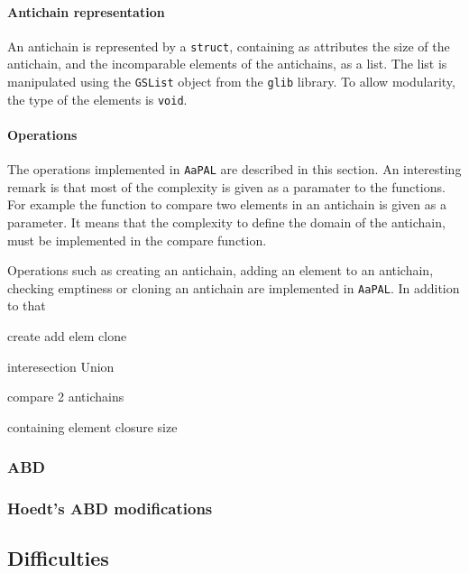 \documentclass[letterpaper]{article}
\begin{document}
\paragraph{Antichain representation}

An antichain is represented by a \texttt{struct}, containing as attributes
the size of the antichain, and the incomparable elements of the antichains,
as a list. The list is manipulated using the \texttt{GSList} object
from the \texttt{glib} library. To allow modularity, the type of the elements
is \texttt{void}.

\paragraph{Operations}

The operations implemented in \texttt{AaPAL}
are described in this section.
An interesting remark is that most of the complexity is given as a paramater
to the functions. For example the function to compare two elements in
an antichain is given as a parameter. It means that the complexity to define
the domain of the antichain, must be implemented in the compare function.

Operations such as creating an antichain,
adding an element to
an antichain, checking emptiness or cloning an antichain are implemented
in \texttt{AaPAL}. In addition to that

create
add elem
clone

interesection
Union

compare 2 antichains

containing element
closure size



\subsubsection{ABD}

\subsubsection{Hoedt's ABD modifications}



\subsection{Difficulties}
\end{document}
